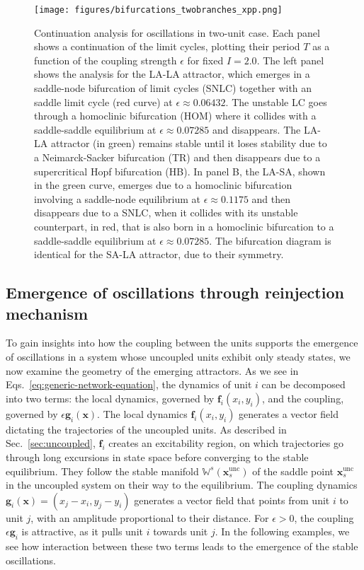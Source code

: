 \begin{figure}[h!]
    \centering
    \texttt{[image: figures/bifurcations\_twobranches\_xpp.png]}
    \caption{Continuation analysis for oscillations in two-unit case. Each panel shows a continuation of the limit cycles, plotting their period $T$ as a function of the coupling strength $\epsilon$ for fixed $I = 2.0$. The left panel shows the analysis for the LA-LA attractor, which emerges in a saddle-node bifurcation of limit cycles (SNLC) together with an saddle limit cycle (red curve) at $\epsilon \approx 0.06432$. The unstable LC goes through a homoclinic bifurcation (HOM) where it collides with a saddle-saddle equilibrium at $\epsilon \approx 0.07285$ and disappears. The LA-LA attractor (in green) remains stable until it loses stability due to a Neimarck-Sacker bifurcation (TR) and then disappears due to a supercritical Hopf bifurcation (HB). In panel B, the LA-SA, shown in the green curve, emerges due to a homoclinic bifurcation involving a saddle-node equilibrium at $\epsilon \approx 0.1175$ and then disappears due to a SNLC, when it collides with its unstable counterpart, in red, that is also born in a homoclinic bifurcation to a saddle-saddle equilibrium at $\epsilon \approx 0.07285$. The bifurcation diagram is identical for the SA-LA attractor, due to their symmetry.}
    \label{fig:bifurcations-2-units}
\end{figure}

\subsection{Emergence of oscillations through reinjection mechanism}\label{sec:geometry}
To gain insights into how the coupling between the units supports the emergence of oscillations in a system whose uncoupled units exhibit only steady states, we now examine the geometry of the emerging attractors. As we see in Eqs.~\ref{eq:generic-network-equation}, the dynamics of unit $i$ can be decomposed into two terms: the local dynamics, governed by $\mathbf{f}_i(x_i,y_i)$, and the coupling, governed by $\epsilon \mathbf{g}_i(\mathbf{x})$. The local dynamics $\mathbf{f}_i(x_i, y_i)$ generates a vector field dictating the trajectories of the uncoupled units. As described in Sec.~\ref{sec:uncoupled}, $\mathbf{f}_i$ creates an excitability region, on which trajectories go through long excursions in state space before converging to the stable equilibrium. They follow the stable manifold $\mathbb{W}^s(\mathbf{x}_s^\mathrm{unc})$ of the saddle point $\mathbf{x}_s^\mathrm{unc}$ in the uncoupled system on their way to the equilibrium. The coupling dynamics $\mathbf{g}_i(\mathbf{x}) = (x_j-x_i, y_j-y_i)$ generates a vector field that points from unit $i$ to unit $j$, with an amplitude proportional to their distance. For $\epsilon > 0$, the coupling $\epsilon \mathbf{g}_i$ is attractive, as it pulls unit $i$ towards unit $j$. In the following examples, we see how interaction between these two terms leads to the emergence of the stable oscillations. 

